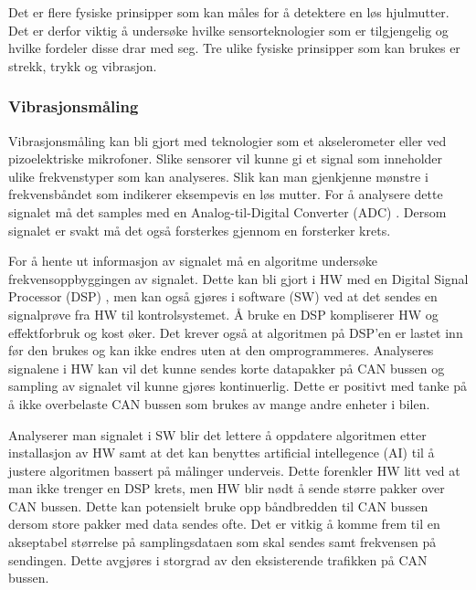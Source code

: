 Det er flere fysiske prinsipper som kan måles for å detektere en løs hjulmutter.
Det er derfor viktig å undersøke hvilke sensorteknologier som er tilgjengelig og
hvilke fordeler disse drar med seg. Tre ulike fysiske prinsipper som kan brukes er strekk, trykk og vibrasjon. 

\subsubsection{Vibrasjonsmåling}

Vibrasjonsmåling kan bli gjort med teknologier som et akselerometer eller ved
pizoelektriske mikrofoner. Slike sensorer vil kunne gi et signal som inneholder
ulike frekvenstyper som kan analyseres. Slik kan man gjenkjenne mønstre i
frekvensbåndet som indikerer eksempevis en løs mutter. For å analysere dette signalet må det
samples med en Analog-til-Digital Converter (ADC) \cite{adc}. Dersom signalet er svakt må det også forsterkes gjennom en
forsterker krets. 

For å hente ut informasjon av signalet må en algoritme undersøke
frekvensoppbyggingen av signalet. Dette kan bli gjort i HW med en Digital Signal Processor (DSP) \cite{dsp}, men kan
også gjøres i software (SW) ved at det sendes en signalprøve fra HW til kontrolsystemet. Å
bruke en DSP kompliserer HW og effektforbruk og kost øker. Det krever også at algoritmen på DSP'en 
er lastet inn før den brukes og kan ikke endres uten at den omprogrammeres. Analyseres signalene i HW kan vil
det kunne sendes korte datapakker på CAN bussen og sampling av signalet vil kunne gjøres kontinuerlig. Dette er
positivt med tanke på å ikke overbelaste CAN bussen som brukes av mange andre enheter i bilen. 

Analyserer man signalet i SW blir det lettere å oppdatere algoritmen etter installasjon av HW
samt at det kan benyttes artificial intellegence (AI) til å justere algoritmen bassert på målinger underveis. 
Dette forenkler HW litt ved at man ikke trenger en DSP krets, men HW blir nødt å sende større pakker over CAN
bussen. Dette kan potensielt bruke opp båndbredden til CAN bussen dersom store pakker med data sendes ofte. 
Det er vitkig å komme frem til en akseptabel størrelse på samplingsdataen som skal sendes samt frekvensen på
sendingen. Dette avgjøres i storgrad av den eksisterende trafikken på CAN bussen.

%

